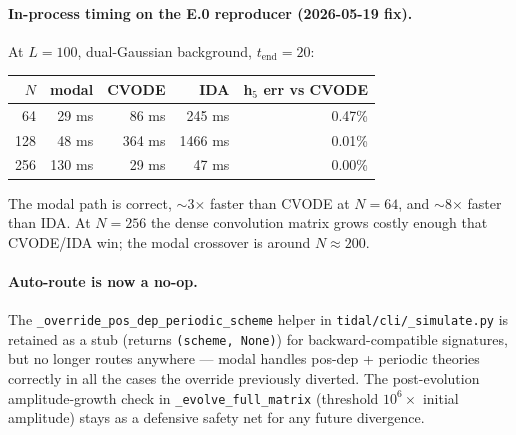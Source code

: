 \paragraph{In-process timing on the E.0 reproducer (2026-05-19 fix).}
At $L = 100$, dual-Gaussian background, $t_{\mathrm{end}} = 20$:
\begin{center}
\begin{tabular}{rrrrr}
\toprule
$N$ & modal & CVODE & IDA & h$_5$ err vs CVODE \\
\midrule
64 & 29 ms & 86 ms & 245 ms & 0.47\% \\
128 & 48 ms & 364 ms & 1466 ms & 0.01\% \\
256 & 130 ms & 29 ms & 47 ms & 0.00\% \\
\bottomrule
\end{tabular}
\end{center}
The modal path is correct, $\sim$3$\times$ faster than CVODE at
$N=64$, and $\sim$8$\times$ faster than IDA. At $N=256$ the dense
convolution matrix grows costly enough that CVODE/IDA win; the modal
crossover is around $N \approx 200$.

\paragraph{Auto-route is now a no-op.} The
\texttt{\_override\_pos\_dep\_periodic\_scheme} helper in
\texttt{tidal/cli/\_simulate.py} is retained as a stub (returns
\texttt{(scheme, None)}) for backward-compatible signatures, but no
longer routes anywhere — modal handles pos-dep + periodic theories
correctly in all the cases the override previously diverted. The
post-evolution amplitude-growth check in
\texttt{\_evolve\_full\_matrix} (threshold $10^6\times$ initial
amplitude) stays as a defensive safety net for any future divergence.

